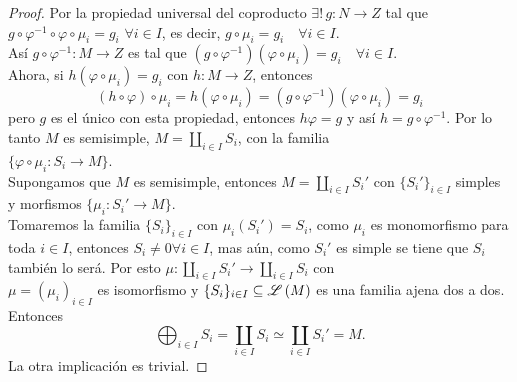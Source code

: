 \documentclass{article}
\begin{document}
\begin{enumerate}[label=\textbf{Ej \arabic*.}]
\begin{proof}
			Por la propiedad universal del coproducto $\exists !\,g\colon N\longrightarrow Z$ tal que \\
			$g\circ \varphi^{-1}\circ\varphi\circ \mu_i=g_i \,\, \forall i\in I$, es decir, $g\circ\mu_i=g_i\quad \forall i\in I$.\\
			Así $g\circ \varphi^{-1}\colon M\longrightarrow Z$ es tal que $(g\circ \varphi^{-1})(\varphi\circ \mu_i)=g_i\quad \forall i\in I$.\\
			Ahora, si $h(\varphi\circ \mu_i)=g_i$ con $h\colon M\longrightarrow Z$, entonces 
			\[(h\circ\varphi)\circ \mu_i=h(\varphi\circ \mu_i)=(g\circ \varphi^{-1})(\varphi\circ \mu_i)=g_i\]
			pero $g$ es el único con esta propiedad, entonces $h\varphi=g$ y así $h=g\circ \varphi^{-1}$. Por lo tanto $M$ es semisimple,
			$M=\displaystyle\coprod_{i\in I}S_i$, con la familia\\ $\{\varphi\circ\mu_i\colon S_i\longrightarrow M\}$.\\
			
			 Supongamos que $M$ es semisimple, entonces $M=\displaystyle\coprod_{i\in I}S_i'$ con $\{S_i'\}_{i\in I}$ simples y 
			morfismos $\{\mu_i\colon S_i'\longrightarrow M\}$.\\
			Tomaremos la familia $\{S_i\}_{i\in I}$ con $\mu_i(S_i')=S_i$, como $\mu_i$ es monomorfismo para toda $i\in I$, entonces
			$S_i\neq 0$\quad $\forall i\in I$, mas aún, como $S_i'$ es simple se tiene que $S_i $ también lo será. Por esto
			$\mu:\displaystyle\coprod_{i\in I}S_i'\longrightarrow \displaystyle\coprod_{i\in I}S_i$ con \\$\mu=(\mu_i)_{i\in I}$ es isomorfismo
			y $\{S_i\}_{i\in I}\subseteq\mathscr{L}\left(M\right)$ es una familia ajena dos a dos. Entonces 
			\[\bigoplus_{i\in I}S_i=\coprod_{i\in I}S_i\simeq \coprod_{i\in I}S_i'=M.\]
			La otra implicación es trivial.
		\end{proof}
	\end{enumerate}
\end{document}
